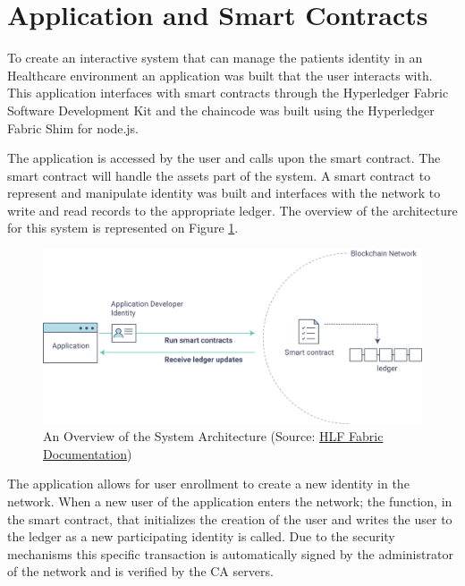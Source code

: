 \section{Application and Smart Contracts}

To create an interactive system that can manage the patients identity in an
Healthcare environment an application was built that the user interacts with.
This application interfaces with smart contracts through the Hyperledger Fabric
Software Development Kit and the chaincode was built using the Hyperledger
Fabric Shim for node.js.

The application is accessed by the user and calls upon the smart contract.  The
smart contract will handle the assets part of the system.  A smart contract to
represent and manipulate identity was built and interfaces with the network to
write and read records to the appropriate ledger. The overview of the
architecture for this system is represented on Figure \ref{fig:appOverview}.

\begin{figure}[ht]
\centering
\includegraphics[width=1\linewidth]{imgs/hyperledgerAppOverview.png}
\caption{\label{fig:appOverview}An Overview of the System Architecture (Source: \href{http://hyperledger-fabric.readthedocs.io/en/latest/write_first_app.html}{HLF Fabric Documentation})}
\end{figure}

The application allows for user enrollment to create a new identity in the
network.  When a new user of the application enters the network; the function,
in the smart contract, that initializes the creation of the user and writes the
user to the ledger as a new participating identity is called. Due to the
security mechanisms this specific transaction is automatically signed by the
administrator of the network and is verified by the CA servers.

